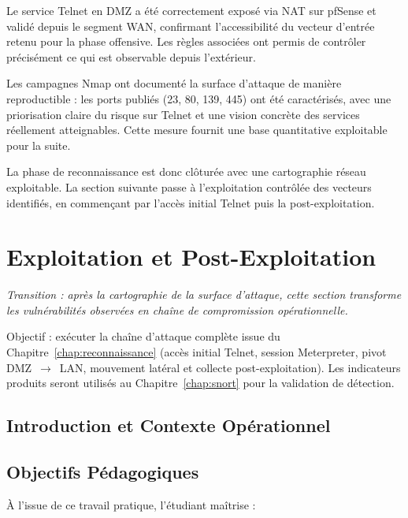 \documentclass[12pt,a4paper,openany]{report}
\begin{document}
	Le service Telnet en DMZ a été correctement exposé via NAT sur pfSense et validé depuis le segment WAN, confirmant l'accessibilité du vecteur d'entrée retenu pour la phase offensive. Les règles associées ont permis de contrôler précisément ce qui est observable depuis l'extérieur.
	
	Les campagnes Nmap ont documenté la surface d'attaque de manière reproductible : les ports publiés (23, 80, 139, 445) ont été caractérisés, avec une priorisation claire du risque sur Telnet et une vision concrète des services réellement atteignables. Cette mesure fournit une base quantitative exploitable pour la suite.
	
	La phase de reconnaissance est donc clôturée avec une cartographie réseau exploitable. La section suivante passe à l'exploitation contrôlée des vecteurs identifiés, en commençant par l'accès initial Telnet puis la post-exploitation.
	
	\section{Exploitation et Post-Exploitation}
	\label{sec:exploitation}
	
	\noindent\textit{Transition : après la cartographie de la surface d'attaque, cette section transforme les vulnérabilités observées en chaîne de compromission opérationnelle.}
	
	\begin{tcolorbox}[colback=primary!5!white, colframe=primary, title=\textbf{Objectifs du Chapitre}]
		Objectif : exécuter la chaîne d'attaque complète issue du Chapitre~\ref{chap:reconnaissance} (accès initial Telnet, session Meterpreter, pivot DMZ~$\rightarrow$~LAN, mouvement latéral et collecte post-exploitation). Les indicateurs produits seront utilisés au Chapitre~\ref{chap:snort} pour la validation de détection.
	\end{tcolorbox}
	
	\subsection{Introduction et Contexte Opérationnel}
	
	\subsection{Objectifs Pédagogiques}
	
	À l'issue de ce travail pratique, l'étudiant maîtrise :
	
\end{document}
